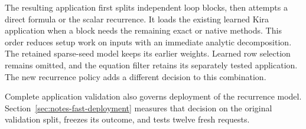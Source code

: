 The resulting application first splits independent loop blocks, then attempts a direct formula or the scalar recurrence. It loads the existing learned Kira application when a block needs the remaining exact or native methods. This order reduces setup work on inputs with an immediate analytic decomposition. The retained sparse-seed model keeps its earlier weights. Learned row selection remains omitted, and the equation filter retains its separately tested application. The new recurrence policy adds a different decision to this combination.

Complete application validation also governs deployment of the recurrence model. Section~\ref{sec:notes-fast-deployment} measures that decision on the original validation split, freezes its outcome, and tests twelve fresh requests.
